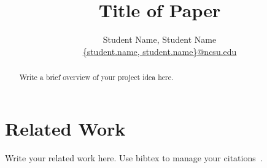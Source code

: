 \documentclass[10pt,twocolumn,pdftex]{article}
\title{Title of Paper}
\author{Student Name, Student Name \\
\url{{student.name, student.name}@ncsu.edu}}
\date{}
\begin{document}
\maketitle

\begin{abstract}
  Write a brief overview of your project idea here.
\end{abstract}

\newpage
\hspace{1em}
\newpage

\section{Related Work}

Write your related work here. Use bibtex to manage your
citations~\cite{dsd13}.



\end{document}
